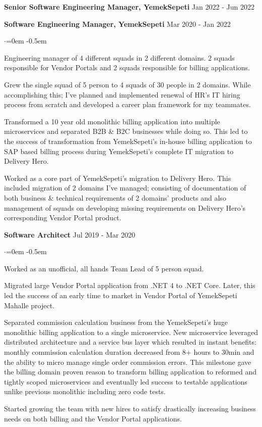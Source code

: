 \documentclass{article}
\newenvironment{rExpDetailsByTitle}[2]{
    \begin{adjustwidth}{10pt}{0pt}
    {\bf #1} \hfill {#2}
    \vspace{0.5em}
    \end{adjustwidth}
    \begin{adjustwidth}{20pt}{0pt}
    \begin{list}
    {$\cdot$}{\leftmargin=0em}
    \itemsep -0.5em \vspace{-0.5em}
}{
    \end{list}
    \vspace{0.3em}
    \end{adjustwidth}
}
\newenvironment{rExpDetailsByTitleDouble}[4]{
    \begin{adjustwidth}{10pt}{0pt}
    {\bf #1} \hfill {#2}
    \end{adjustwidth}
    \begin{adjustwidth}{10pt}{0pt}
    {\bf #3} \hfill {#4}
    \vspace{0.5em}
    \end{adjustwidth}
    \begin{adjustwidth}{20pt}{0pt}
    \begin{list}
    {$\cdot$}{\leftmargin=0em}
    \itemsep -0.5em \vspace{-0.5em}
}{
    \end{list}
    \vspace{0.3em}
    \end{adjustwidth}
}
\newcommand{\ys}{YemekSepeti\xspace}
\newcommand{\dhero}{Delivery Hero\xspace}
\begin{document}
\begin{rExpDetailsByTitleDouble}
    {Senior Software Engineering Manager, \ys}
    {Jan 2022 - Jun 2022}
    {Software Engineering Manager, \ys}
    {Mar 2020 - Jan 2022}
    \item Engineering manager of 4 different squads in 2 different domains. 2 squads responsible for Vendor Portals and 2 squads responsible for billing applications.
    \item Grew the single squad of 5 person to 4 squads of 30 people in 2 domains. While accomplishing this; I've planned and implemented renewal of HR's IT hiring process from scratch and developed a career plan framework for my teammates.
    \item Transformed a 10 year old monolithic billing application into multiple microservices and separated B2B \& B2C businesses while doing so. This led to the success of transformation from \ys's in-house billing application to SAP based billing process during \ys's complete IT migration to \dhero.
    \item Worked as a core part of \ys's migration to \dhero. This included migration of 2 domains I've managed; consisting of documentation of both business \& technical requirements of 2 domains' products and also management of squads on developing missing requirements on \dhero's corresponding Vendor Portal product.
\end{rExpDetailsByTitleDouble}

\begin{rExpDetailsByTitle}
    {Software Architect}
    {Jul 2019 - Mar 2020}
    \item Worked as an unofficial, all hands Team Lead of 5 person squad.
    \item Migrated large Vendor Portal application from .NET 4 to .NET Core. Later, this led the success of an early time to market in Vendor Portal of \ys Mahalle project.
    \item Separated commission calculation business from the \ys's huge monolithic billing application to a single microservice. New microservice leveraged distributed architecture and a service bus layer which resulted in instant benefits: monthly commission calculation duration decreased from 8+ hours to 30min and the ability to micro manage single order commission errors. This milestone gave the billing domain proven reason to transform billing application to reformed and tightly scoped microservices and eventually led success to testable applications unlike previous monolithic including zero code tests.
    \item Started growing the team with new hires to satisfy drastically increasing business needs on both billing and the Vendor Portal applications.
\end{rExpDetailsByTitle}
\end{document}
